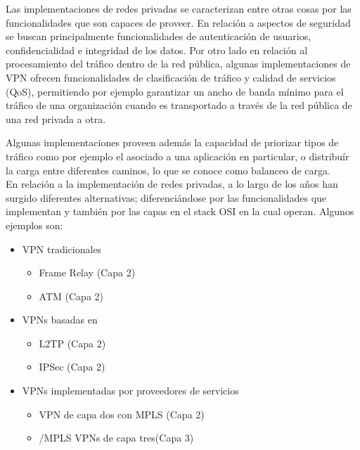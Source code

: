 Las implementaciones de redes privadas se caracterizan entre otras cosas por las funcionalidades que son capaces de proveer. En relaci\'on a aspectos de seguridad se buscan principalmente funcionalidades de autenticaci\'on de usuarios, confidencialidad e integridad de los datos. Por otro lado en relaci\'on al procesamiento del tr\'afico dentro de la red p\'ublica, algunas implementaciones de VPN ofrecen funcionalidades de clasificaci\'on de tr\'afico y calidad de servicios (QoS), permitiendo por ejemplo garantizar un ancho de banda m\'inimo para el tr\'afico de una organizaci\'on cuando es transportado a trav\'es de la red p\'ublica de una red privada a otra. 

Algunas implementaciones proveen adem\'as la capacidad de priorizar tipos de tr\'afico como por ejemplo el asociado a una aplicaci\'on en particular, o distribu\'ir la carga entre diferentes caminos, lo que se conoce como balanceo de carga.\\


En relaci\'on a la implementaci\'on de redes privadas, a lo largo de los años han surgido diferentes alternativas; diferenciándose por las funcionalidades que implementan y tambi\'en por las capas en el stack OSI en la cual operan. Algunos ejemplos son: 

\begin{itemize}
\item VPN tradicionales
	\begin{itemize}
	\item Frame Relay (Capa 2)	
	\item ATM (Capa 2)
	\end{itemize}
	
\item VPNs basadas en 
	\begin{itemize}
	\item L2TP (Capa 2)
	\item IPSec (Capa 2)
	\end{itemize}
	
\item VPNs implementadas por proveedores de servicios
	\begin{itemize}
	\item VPN de capa dos con MPLS (Capa 2)
	\item {}/MPLS VPNs de capa tres(Capa 3)
	\end{itemize}
\end{itemize}

